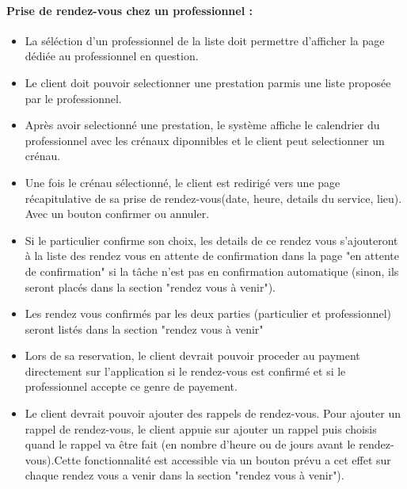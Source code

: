 \documentclass{article}
\begin{document}
\paragraph{Prise de rendez-vous chez un professionnel :}
\begin{itemize}

\item La séléction d'un
  professionnel de la liste doit permettre d'afficher la
  page dédiée au professionnel en question.
\item Le client doit pouvoir selectionner une prestation parmis une liste
  proposée par le professionnel.
\item Après avoir selectionné une prestation, le système affiche le
  calendrier du professionnel avec les crénaux diponnibles et le
  client peut selectionner un crénau.
\item Une fois le crénau sélectionné, le client est redirigé vers
    une page récapitulative de sa prise de rendez-vous(date, heure, details du service, lieu). Avec un bouton
    confirmer ou annuler.
\item Si le particulier confirme son choix, les details de ce rendez vous s'ajouteront à la liste des rendez 
vous en attente de confirmation dans la page "en attente de confirmation"
si la tâche n'est pas en confirmation automatique (sinon, ils seront placés dans la section "rendez vous à venir").
\item Les rendez vous confirmés par les deux parties (particulier et professionnel) seront listés dans la section "rendez vous à venir"
\item Lors de sa reservation, le client devrait pouvoir proceder au
  payment directement sur l'application si le rendez-vous est confirmé et si le professionnel accepte ce genre de payement.
\item Le client devrait pouvoir ajouter des
  rappels de rendez-vous. Pour ajouter un rappel de rendez-vous, le
  client appuie sur \og ajouter un rappel \fg{} puis choisis quand le
  rappel va être fait (en nombre d'heure ou de jours avant le
  rendez-vous).Cette fonctionnalité est accessible via un bouton 
  prévu a cet effet sur chaque rendez vous a venir dans la section "rendez vous à venir").



\end{itemize}
\end{document}
